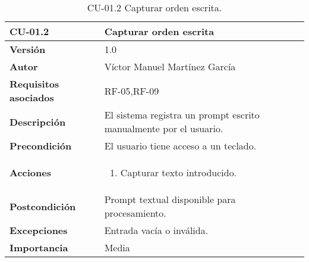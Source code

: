 \begin{table}[p]
    \centering
    \begin{tabularx}{\linewidth}{ p{} p{} }
        \toprule
        \textbf{CU-01.2}    & \textbf{Capturar orden escrita}\\
        \toprule
        \textbf{Versión}              & 1.0 \\
        \textbf{Autor}                & Víctor Manuel Martínez García \\
        \textbf{Requisitos asociados} & RF-05,RF-09 \\
        \textbf{Descripción}          & El sistema registra un prompt escrito manualmente por el usuario.\\
        \textbf{Precondición}         & El usuario tiene acceso a un teclado.\\
        \textbf{Acciones}             &
        \begin{enumerate}
          \item Capturar texto introducido.
        \end{enumerate}\\
        \textbf{Postcondición}        & Prompt textual disponible para procesamiento.\\
        \textbf{Excepciones}          & Entrada vacía o inválida.\\
        \textbf{Importancia}          & Media \\
        \bottomrule
    \end{tabularx}
    \caption{CU-01.2 Capturar orden escrita.}
    \label{CU-01.2 Capturar prompt escrito}
\end{table}



